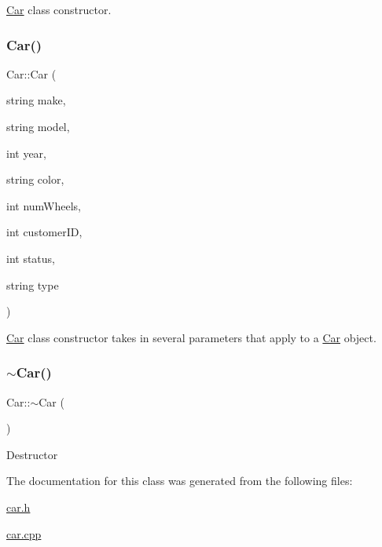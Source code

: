 \hyperlink{class_car}{Car} class constructor. \mbox{\label{class_car_a618f4d3c9a4edd09cb6477db71266fdd}} 
\subsubsection{\texorpdfstring{Car()}{Car()}\hspace{0.1cm}{\footnotesize\ttfamily [2/2]}}
{\footnotesize\ttfamily Car\+::\+Car (\begin{DoxyParamCaption}\item[{string}]{make,  }\item[{string}]{model,  }\item[{int}]{year,  }\item[{string}]{color,  }\item[{int}]{num\+Wheels,  }\item[{int}]{customer\+ID,  }\item[{int}]{status,  }\item[{string}]{type }\end{DoxyParamCaption})}

\hyperlink{class_car}{Car} class constructor takes in several parameters that apply to a \hyperlink{class_car}{Car} object. \mbox{\label{class_car_a5933bb06e96b159fe339a128abda888a}} 
\subsubsection{\texorpdfstring{$\sim$\+Car()}{~Car()}}
{\footnotesize\ttfamily Car\+::$\sim$\+Car (\begin{DoxyParamCaption}{ }\end{DoxyParamCaption})}

Destructor 

The documentation for this class was generated from the following files\+:\begin{DoxyCompactItemize}
\item 
\hyperlink{car_8h}{car.\+h}\item 
\hyperlink{car_8cpp}{car.\+cpp}\end{DoxyCompactItemize}
